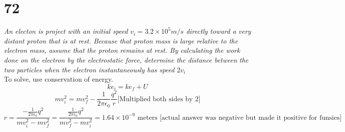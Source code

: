 \documentclass{article}
\begin{document}
\section*{72}
\emph{An electon is project with an initial speed $v_i = 3.2\times 10^5 m/s$ directly toward a very distant proton that is at rest. Because that proton mass is large relative to the electron mass, assume that the proton remains at rest. By calculating the work done on the electron by the electrostatic force, determine the distance between the two particles when the electron instantaneously has speed $2v_i$}\\
To solve, use conservation of energy.
$$ke_i = ke_f + U$$ 
$$mv_i^2 = mv_f^2 - \frac{1}{2\pi\epsilon_0} \frac{q^2}{r} \text{[Multiplied both sides by 2]}$$
$$r = \frac{-\frac{1}{2\pi\epsilon_0} q^2}{mv_i^2- mv_f^2} = \frac{\frac{1}{2\pi\epsilon_0}q^2}{mv_f^2 - mv_i^2} = \boxed{1.64 \times 10 ^{-9} \text{ meters}} \text{ [actual answer was negative but made it positive for funsies]}$$
\end{document}
